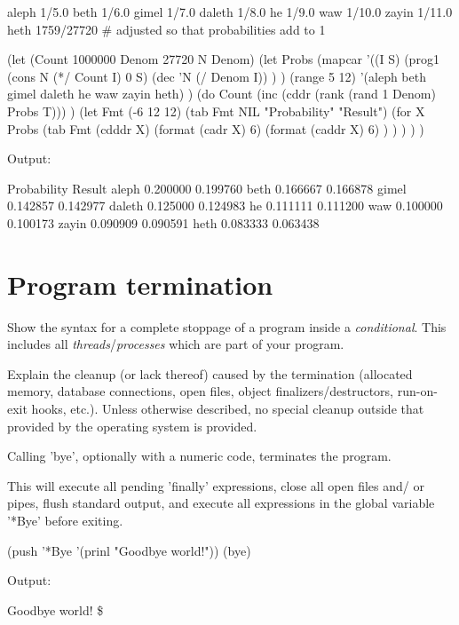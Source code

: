 \begin{wideverbatim}
aleph   1/5.0
beth    1/6.0
gimel   1/7.0
daleth  1/8.0
he      1/9.0
waw     1/10.0
zayin   1/11.0
heth    1759/27720 # adjusted so that probabilities add to 1
\end{wideverbatim}


\begin{wideverbatim}

(let (Count 1000000  Denom 27720  N Denom)
   (let Probs
      (mapcar
         '((I S)
            (prog1 (cons N (*/ Count I) 0 S)
               (dec 'N (/ Denom I)) ) )
         (range 5 12)
         '(aleph beth gimel daleth he waw zayin heth) )
      (do Count
         (inc (cddr (rank (rand 1 Denom) Probs T))) )
      (let Fmt (-6 12 12)
         (tab Fmt NIL "Probability" "Result")
         (for X Probs
            (tab Fmt
               (cdddr X)
               (format (cadr X) 6)
               (format (caddr X) 6) ) ) ) ) )

Output:

       Probability      Result
aleph     0.200000    0.199760
beth      0.166667    0.166878
gimel     0.142857    0.142977
daleth    0.125000    0.124983
he        0.111111    0.111200
waw       0.100000    0.100173
zayin     0.090909    0.090591
heth      0.083333    0.063438

\end{wideverbatim}

\pagebreak{}
\section*{Program termination}

Show the syntax for a complete stoppage of a program inside a
\emph{conditional}. This includes all \emph{threads}/\emph{processes}
which are part of your program.

Explain the cleanup (or lack thereof) caused by the termination
(allocated memory, database connections, open files, object
finalizers/destructors, run-on-exit hooks, etc.). Unless otherwise
described, no special cleanup outside that provided by the operating
system is provided.

\begin{wideverbatim}

Calling 'bye', optionally with a numeric code, terminates the program.

This will execute all pending 'finally' expressions, close all open files and/
or pipes, flush standard output, and execute all expressions in the global
variable '*Bye' before exiting.

(push '*Bye '(prinl "Goodbye world!"))
(bye)

Output:

Goodbye world!
\$

\end{wideverbatim}

